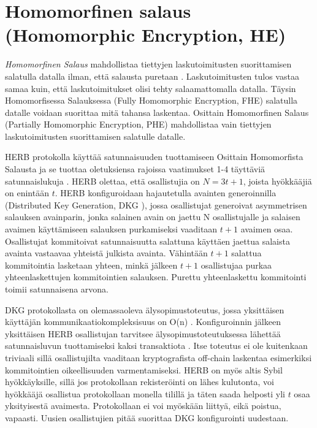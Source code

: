 
\section{Homomorfinen salaus (Homomorphic Encryption, HE)}

\textit{Homomorfinen Salaus} mahdollistaa tiettyjen laskutoimitusten suorittamisen salatulla datalla ilman, että salausta puretaan \cite{alma9928100443506253}. Laskutoimitusten tulos vastaa samaa kuin, että laskutoimitukset olisi tehty salaamattomalla datalla. Täysin Homomorfisessa Salauksessa (Fully Homomorphic Encryption, FHE) salatulla datalle voidaan suorittaa mitä tahansa laskentaa. Osittain Homomorfinen Salaus (Partially Homomorphic Encryption, PHE) mahdollistaa vain tiettyjen laskutoimitusten suorittamisen salatulle datalle.

HERB protokolla käyttää satunnaisuuden tuottamiseen Osittain Homomorfista Salausta ja se tuottaa oletuksiensa rajoissa vaatimukset 1-4 täyttäviä satunnaislukuja \cite{cherniaeva2019homomorphic}. HERB olettaa, että osallistujia on $N=3t+1$, joista hyökkääjiä on enintään $t$. HERB konfiguroidaan hajautetulla avainten generoinnilla (Distributed Key Generation, DKG \cite{pedersen1991threshold}), jossa osallistujat generoivat asymmetrisen salauksen avainparin, jonka salainen avain on jaettu N osallistujalle ja salaisen avaimen käyttämiseen salauksen purkamiseksi vaaditaan $t+1$ avaimen osaa. Osallistujat kommitoivat satunnaisuutta salattuna käyttäen jaettua salaista avainta vastaavaa yhteistä julkista avainta. Vähintään $t+1$ salattua kommitointia lasketaan yhteen, minkä jälkeen $t+1$ osallistujaa purkaa yhteenlaskettujen kommitointien salauksen. Purettu yhteenlaskettu kommitointi toimii satunnaisena arvona. 

DKG protokollasta on olemassaoleva älysopimustoteutus, jossa yksittäisen käyttäjän kommunikaatiokompleksisuus on O(n) \cite{schindler2019ethdkg}. Konfiguroinnin jälkeen yksittäisen HERB osallistujan tarvitsee älysopimustoteutuksessa lähettää satunnaisluvun tuottamiseksi kaksi transaktiota \cite{cherniaeva2019homomorphic}. Itse toteutus ei ole kuitenkaan triviaali sillä osallistujilta vaaditaan kryptografista off-chain laskentaa esimerkiksi kommitointien oikeellisuuden varmentamiseksi. HERB on myös altis Sybil hyökkäyksille, sillä jos protokollaan rekisteröinti on lähes kulutonta, voi hyökkääjä osallistua protokollaan monella tilillä ja täten saada helposti yli $t$ osaa yksityisestä avaimesta. Protokollaan ei voi myöskään liittyä, eikä poistua, vapaasti. Uusien osallistujien pitää suorittaa DKG konfigurointi uudestaan. 

